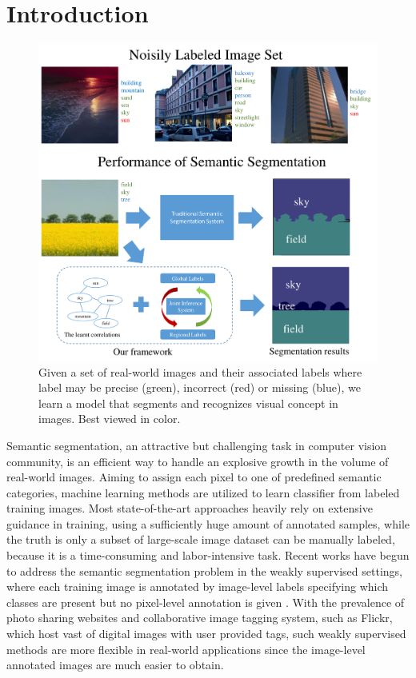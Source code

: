 \section{Introduction}

\begin{figure}[t]
\begin{center}
    \includegraphics[width=1\linewidth]{fig_noisyparsing.pdf}
\end{center}
    \caption{Given a set of real-world images and their associated labels where label may be precise (green), incorrect (red) or missing (blue), we learn a model that segments and recognizes visual concept in images. Best viewed in color.}
\label{fig:noisyparsing}
\vspace{-3mm}
\end{figure}

Semantic segmentation, an attractive but challenging task in computer vision community, is an efficient way to handle an explosive growth in the volume of real-world images. 
\if
Aiming to assign each pixel to one of predefined semantic categories, machine learning methods are utilized to learn classifier from labeled training images. 
\fi
Most state-of-the-art approaches heavily rely on extensive guidance in training, using a sufficiently huge amount of annotated samples, while the truth is only a subset of large-scale image dataset can be manually labeled, because it is a time-consuming and labor-intensive task. Recent works have begun to address the semantic segmentation problem in the weakly supervised settings, where each training image is annotated by image-level labels specifying which classes are present but no pixel-level annotation is given \cite{verbeek2007region,vezhnevets2010towards,vezhnevets2011weakly,vezhnevets2012weakly,xu2014tell,zhang2013sparse,zhang2013probabilistic}. With the prevalence of photo sharing websites and collaborative image tagging system, such as Flickr, which host vast of digital images with user provided tags, such weakly supervised methods are more flexible in real-world applications since the image-level annotated images are much easier to obtain.

